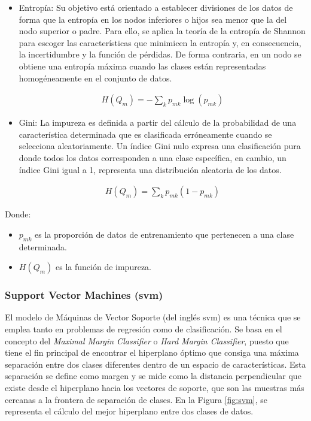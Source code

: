\begin{itemize}
    \item Entropía: Su objetivo está orientado a establecer divisiones de los datos de forma que la entropía en los nodos inferiores o hijos sea menor que la del nodo superior o padre. Para ello, se aplica la teoría de la entropía de Shannon \cite{rfmedium2} para escoger las características que minimicen la entropía y, en consecuencia, la incertidumbre y la función de pérdidas. De forma contraria, en un nodo se obtiene una entropía máxima cuando las clases están representadas homogéneamente en el conjunto de datos.
    
    \begin{equation}
        \begin{aligned}
            H(Q_m) = - \sum_k p_{mk} \log(p_{mk})
        \end{aligned}
    \end{equation}
    
    \item Gini: La impureza es definida a partir del cálculo de la probabilidad de una característica determinada que es clasificada erróneamente cuando se selecciona aleatoriamente. Un índice Gini nulo expresa una clasificación pura donde todos los datos corresponden a una clase específica, en cambio, un índice Gini igual a 1, representa una distribución aleatoria de los datos.
    
    \begin{equation}
        \begin{aligned}
            H(Q_m) = \sum_k p_{mk} (1 - p_{mk})
        \end{aligned}
    \end{equation}
\end{itemize}

Donde:
\begin{itemize}
    \renewcommand{\labelitemi}{}
    \item \(p_{mk}\) es la proporción de datos de entrenamiento que pertenecen a una clase determinada.
    \item \(H(Q_m)\) es la función de impureza.
\end{itemize}


\subsubsection{Support Vector Machines (\acrshort{svm})}
\label{sec:mlsvm}

El modelo de Máquinas de Vector Soporte (del inglés \acrfull{svm}) \cite{svmmedium2} \cite{svmciencia} es una técnica que se emplea tanto en problemas de regresión como de clasificación. Se basa en el concepto del \textit{Maximal Margin Classifier} o \textit{Hard Margin Classifier}, puesto que tiene el fin principal de encontrar el hiperplano óptimo que consiga una máxima separación entre dos clases diferentes dentro de un espacio de características. Esta separación se define como margen y se mide como la distancia perpendicular que existe desde el hiperplano hacia los vectores de soporte, que son las muestras más cercanas a la frontera de separación de clases. En la Figura \ref{fig:svm}, se representa el cálculo del mejor hiperplano entre dos clases de datos.

